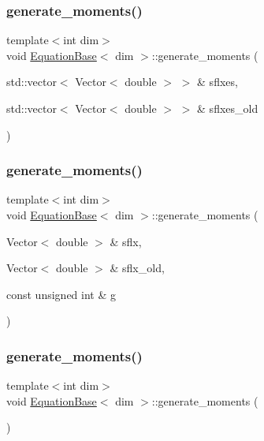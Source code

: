 \subsubsection{\texorpdfstring{generate\+\_\+moments()}{generate\_moments()}\hspace{0.1cm}{\footnotesize\ttfamily [1/3]}}
{\footnotesize\ttfamily template$<$int dim$>$ \\
void \hyperlink{class_equation_base}{Equation\+Base}$<$ dim $>$\+::generate\+\_\+moments (\begin{DoxyParamCaption}\item[{std\+::vector$<$ Vector$<$ double $>$ $>$ \&}]{sflxes,  }\item[{std\+::vector$<$ Vector$<$ double $>$ $>$ \&}]{sflxes\+\_\+old }\end{DoxyParamCaption})\hspace{0.3cm}{\ttfamily [virtual]}}

\mbox{\label{class_equation_base_a893affe5706a8798bed68bb4ff531eec}} 
\subsubsection{\texorpdfstring{generate\+\_\+moments()}{generate\_moments()}\hspace{0.1cm}{\footnotesize\ttfamily [2/3]}}
{\footnotesize\ttfamily template$<$int dim$>$ \\
void \hyperlink{class_equation_base}{Equation\+Base}$<$ dim $>$\+::generate\+\_\+moments (\begin{DoxyParamCaption}\item[{Vector$<$ double $>$ \&}]{sflx,  }\item[{Vector$<$ double $>$ \&}]{sflx\+\_\+old,  }\item[{const unsigned int \&}]{g }\end{DoxyParamCaption})\hspace{0.3cm}{\ttfamily [virtual]}}

\mbox{\label{class_equation_base_ab74a0a15d0d2a20022cafad8dd6f46aa}} 
\subsubsection{\texorpdfstring{generate\+\_\+moments()}{generate\_moments()}\hspace{0.1cm}{\footnotesize\ttfamily [3/3]}}
{\footnotesize\ttfamily template$<$int dim$>$ \\
void \hyperlink{class_equation_base}{Equation\+Base}$<$ dim $>$\+::generate\+\_\+moments (\begin{DoxyParamCaption}{ }\end{DoxyParamCaption})\hspace{0.3cm}{\ttfamily [virtual]}}

